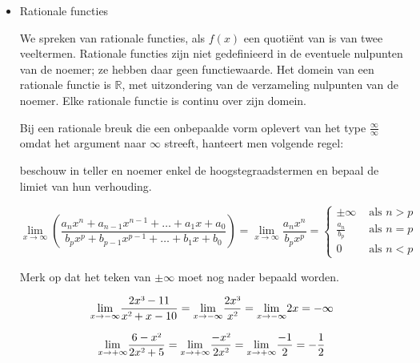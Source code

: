 \begin{itemize}
\item{Rationale functies}

We spreken van rationale functies, als $f(x)$ een quoti\"ent
van is van twee veeltermen. Rationale functies zijn niet gedefinieerd
in de eventuele nulpunten van de noemer; ze hebben daar geen functiewaarde.
Het domein van een rationale functie is $\mathbb{R}$, met uitzondering
van de verzameling nulpunten van de noemer. Elke rationale functie
is continu over zijn domein.

Bij een rationale breuk die een onbepaalde vorm oplevert
van het type $\frac{\infty}{\infty}$ omdat het argument naar $\infty$
streeft, hanteert men volgende regel: 

beschouw in teller en noemer enkel de hoogstegraadstermen en bepaal
de limiet van hun verhouding.



\begin{equation*}
{\displaystyle \lim_{x\to\infty}}\left(\frac{a_{n}x^{n}+a_{n-1}x^{n-1}+\ldots+a_{1}x+a_{0}}{b_{p}x^{p}+b_{p-1}x^{p-1}+\ldots+b_{1}x+b_{0}}\right)={\displaystyle \lim_{x\to\infty}}{\displaystyle \frac{a_{n}x^{n}}{b_{p}x^{p}}} = 
\left\{
\begin{array}{ll}
\pm\infty &\text{ als } n>p \\
\frac{a_n}{b_p} &\text{ als } n=p \\
0 &\text{ als } n<p
\end{array}
\right.
\end{equation*}



Merk op dat het teken van $\pm\infty$ moet nog nader bepaald worden.

\begin{voorbeeld}
	
\begin{equation*}
{\displaystyle \lim_{x\to-\infty}}{\displaystyle \frac{2x\text{\textthreesuperior}-11}{x\text{\texttwosuperior}+x-10}}={\displaystyle \lim_{x\to-\infty}}{\displaystyle \frac{2x\text{\textthreesuperior}}{x\text{\texttwosuperior}}}={\displaystyle \lim_{x\to-\infty}}2x=-\infty
\end{equation*}

\begin{equation*}
{\displaystyle \lim_{x\to+\infty}}{\displaystyle \frac{6-x\text{\texttwosuperior}}{2x\text{\texttwosuperior}+5}}={\displaystyle \lim_{x\to+\infty}}{\displaystyle \frac{-x\text{\texttwosuperior}}{2x\text{\texttwosuperior}}}={\displaystyle \lim_{x\to+\infty}}{\displaystyle \frac{-1}{2}}={\displaystyle -\frac{1}{2}}
\end{equation*}


\end{voorbeeld}
\end{itemize}
